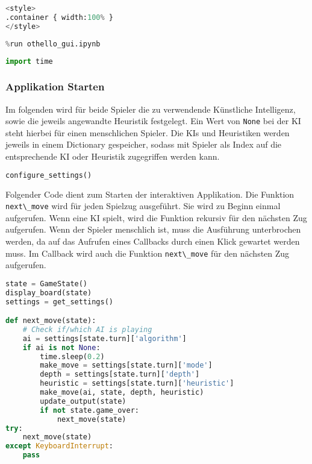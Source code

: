 \begin{lstlisting}[language=Python]
%%HTML
<style>
.container { width:100% }
</style>
\end{lstlisting}

\begin{lstlisting}[language=Python]
%run othello_ai.ipynb
%run othello_gui.ipynb
\end{lstlisting}

\begin{lstlisting}[language=Python]
import time
\end{lstlisting}

\hypertarget{applikation-starten}{%
\subsubsection{Applikation Starten}\label{applikation-starten}}

Im folgenden wird für beide Spieler die zu verwendende Künstliche
Intelligenz, sowie die jeweils angewandte Heuristik festgelegt. Ein Wert
von \passthrough{\lstinline!None!} bei der KI steht hierbei für einen
menschlichen Spieler. Die KIs und Heuristiken werden jeweils in einem
Dictionary gespeicher, sodass mit Spieler als Index auf die
entsprechende KI oder Heuristik zugegriffen werden kann.

\begin{lstlisting}[language=Python]
configure_settings()
\end{lstlisting}

Folgender Code dient zum Starten der interaktiven Applikation. Die
Funktion \passthrough{\lstinline!next\_move!} wird für jeden Spielzug
ausgeführt. Sie wird zu Beginn einmal aufgerufen. Wenn eine KI spielt,
wird die Funktion rekursiv für den nächsten Zug aufgerufen. Wenn der
Spieler menschlich ist, muss die Ausführung unterbrochen werden, da auf
das Aufrufen eines Callbacks durch einen Klick gewartet werden muss. Im
Callback wird auch die Funktion \passthrough{\lstinline!next\_move!} für
den nächsten Zug aufgerufen.

\begin{lstlisting}[language=Python]
state = GameState()
display_board(state)
settings = get_settings()

def next_move(state):
    # Check if/which AI is playing
    ai = settings[state.turn]['algorithm']
    if ai is not None:
        time.sleep(0.2)
        make_move = settings[state.turn]['mode']
        depth = settings[state.turn]['depth']
        heuristic = settings[state.turn]['heuristic']
        make_move(ai, state, depth, heuristic)
        update_output(state)
        if not state.game_over:
            next_move(state)
try:
    next_move(state)
except KeyboardInterrupt:
    pass
\end{lstlisting}
